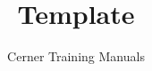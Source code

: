 

\title{Template} %
\author{Cerner Training Manuals}



    \frontmatter
        \maketitle %
        \begin{fullwidth}
            \tableofcontents
        \end{fullwidth}

    \mainmatter
        

    \backmatter


